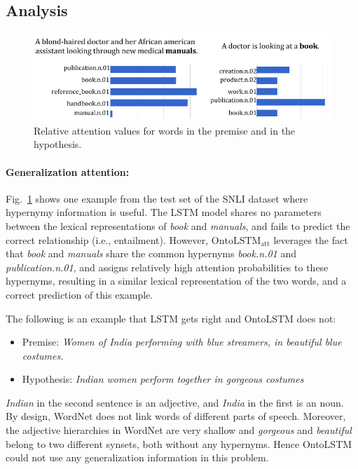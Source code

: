\subsection{Analysis}
\label{sec:discussion}
\begin{figure}
\begin{center}
\includegraphics[width=5in]{figures/ontolstm_snli_comparison.png}
\caption{Relative attention values for words in the premise and in the hypothesis.}
\label{fig:snli_visualization}
\end{center}
\end{figure}

\paragraph{Generalization attention:} \label{sec:generalization}
Fig.~\ref{fig:snli_visualization} shows one example from the test set of the SNLI dataset where hypernymy information is useful. 
The LSTM model shares no parameters between the lexical representations of \textit{book} and \textit{manuals}, and fails to predict the correct relationship (i.e., entailment). 
However, $\text{OntoLSTM}_{\text{att}}$ leverages the fact that \textit{book} and \textit{manuals} share the common hypernyms \textit{book.n.01} and \textit{publication.n.01}, and assigns relatively high attention probabilities to these hypernyms, resulting in a similar lexical representation of the two words, and a correct prediction of this example.

The following is an example that LSTM gets right and OntoLSTM does not:
\begin{itemize}
 \item Premise: \textit{Women of India performing with blue streamers, in beautiful blue costumes.}
 \item Hypothesis: \textit{Indian women perform together in gorgeous costumes}
\end{itemize}
\textit{Indian} in the second sentence is an adjective, and \textit{India} in the first is an noun. By design, WordNet does not link words of different parts of speech. Moreover, the adjective hierarchies in WordNet are very shallow and \textit{gorgeous} and \textit{beautiful} belong to two different synsets, both without any hypernyms. Hence OntoLSTM could not use any generalization information in this problem.

